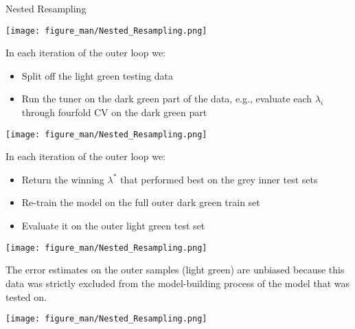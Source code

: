 \documentclass[11pt,compress,t,notes=noshow, xcolor=table]{beamer}
\begin{document}
\begin{vbframe}{Nested Resampling}
\vspace*{-0.3cm}

\begin{center}\texttt{[image: figure\_man/Nested\_Resampling.png]}\end{center}

\framebreak

\begin{footnotesize}
In each iteration of the outer loop we:
\begin{itemize}
\item Split off the light green testing data
\item Run the tuner on the dark green part of the data, e.g.,
  evaluate each $\lambda_i$ through fourfold CV on the dark green part
\end{itemize}
\end{footnotesize}

\begin{center}\texttt{[image: figure\_man/Nested\_Resampling.png]}\end{center}

\framebreak

\begin{footnotesize}
In each iteration of the outer loop we:
\begin{itemize}
\item Return the winning $\lambda^*$ that performed best on the grey inner test sets
\item Re-train the model on the full outer dark green train set
\item Evaluate it on the outer light green test set
\end{itemize}
\end{footnotesize}

\begin{center}\texttt{[image: figure\_man/Nested\_Resampling.png]}\end{center}

\framebreak

\begin{footnotesize}
The error estimates on the outer samples (light green) are unbiased because this data was strictly excluded from the model-building process of the model that was tested on.
\end{footnotesize}


\begin{center}\texttt{[image: figure\_man/Nested\_Resampling.png]}\end{center}

\end{vbframe}
\end{document}
